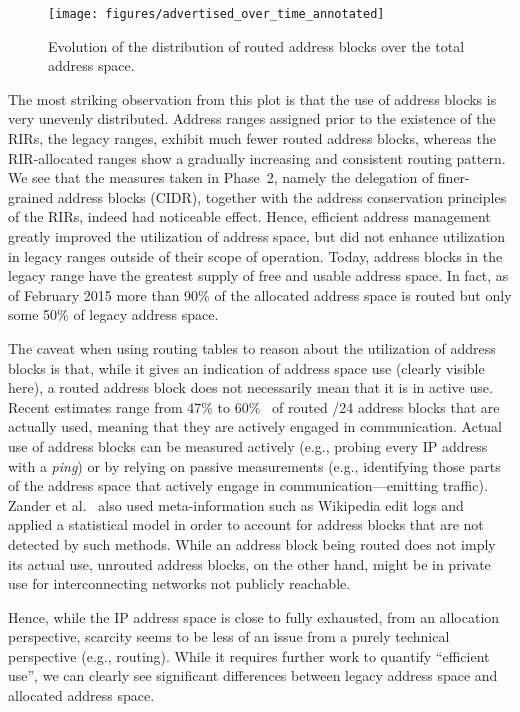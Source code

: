 \documentclass[letter]{sigcomm-alternate}
\begin{document}
\begin{figure*} \centering
\texttt{[image: figures/advertised\_over\_time\_annotated]}
\caption{Evolution of the distribution of routed address blocks
	over the total address space.}
 \vspace{-1em}
 \label{fig:advertised_over_time}
\end{figure*}

The most striking observation from this plot is that the use of address
blocks is very unevenly distributed.  Address ranges assigned prior to
the existence of the RIRs, the legacy ranges, exhibit much fewer routed
address blocks, whereas the RIR-allocated ranges show a gradually increasing and
consistent routing pattern. We see that the measures taken in Phase~2, namely
the delegation of finer-grained address blocks (CIDR), together with the address
conservation principles of the RIRs, indeed had noticeable effect.
Hence, efficient address management greatly improved the utilization of address
space, but did not enhance utilization in legacy ranges outside of
their scope of operation. Today, address blocks in the legacy range have the 
greatest supply of free and usable address space. In fact, as of February 2015 
more than 90\% of the allocated address space is routed but only some 50\% of 
legacy address space.

The caveat when using routing tables to reason about the utilization of address
blocks is that, while it gives an indication of address space use (clearly
visible here), a routed address block does not necessarily mean that it is in
active use. Recent estimates range from 47\% to 60\%~\cite{dainotti_2014, 
lostinspace_2014, capturingghosts} of routed /24 address blocks that are 
actually used, meaning that they are actively engaged in communication. Actual 
use of address blocks can be measured actively (e.g., 
probing every IP address with a \textit{ping}) or by relying on passive 
measurements (e.g., identifying those parts of the address space that actively 
engage in communication---emitting traffic). Zander et 
al.~\cite{capturingghosts} also used meta-information such as Wikipedia edit 
logs and applied a statistical model in order to account for address blocks 
that are not detected by such methods.  While an address block 
being routed does not imply its actual use, unrouted address blocks, on the 
other hand, might be in private use for interconnecting networks not publicly 
reachable.

Hence, while the IP address space is close to fully exhausted, from an
allocation perspective, scarcity seems to be less of an issue from a
purely technical perspective (e.g., routing). While it requires further work to
quantify ``efficient use'', we can clearly see significant differences
between legacy address space and allocated address space.
\end{document}
